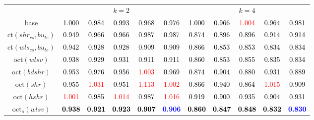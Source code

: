 \begin{tabular}[t]{c|>{}cccc>{}c|ccccc}
\addlinespace[0.3em]
\multicolumn{1}{c}{} & \multicolumn{5}{c}{\textbf{$k = 2$}} & \multicolumn{5}{c}{\textbf{$k = 4$}}\\
base & \textcolor{black}{1.000} & \textcolor{black}{0.984} & \textcolor{black}{0.993} & \textcolor{black}{0.968} & \textcolor{black}{0.976} & \textcolor{black}{1.000} & \textcolor{black}{0.966} & \textcolor{red}{1.004} & \textcolor{black}{0.964} & \textcolor{black}{0.981}\\
ct$(shr_{cs}, bu_{te})$ & \textcolor{black}{0.949} & \textcolor{black}{0.966} & \textcolor{black}{0.966} & \textcolor{black}{0.987} & \textcolor{black}{0.987} & \textcolor{black}{0.874} & \textcolor{black}{0.896} & \textcolor{black}{0.896} & \textcolor{black}{0.914} & \textcolor{black}{0.914}\\
ct$(wls_{cs}, bu_{te})$ & \textcolor{black}{0.942} & \textcolor{black}{0.928} & \textcolor{black}{0.928} & \textcolor{black}{0.909} & \textcolor{black}{0.909} & \textcolor{black}{0.866} & \textcolor{black}{0.853} & \textcolor{black}{0.853} & \textcolor{black}{0.834} & \textcolor{black}{0.834}\\
oct$(wlsv)$ & \textcolor{black}{0.938} & \textcolor{black}{0.929} & \textcolor{black}{0.931} & \textcolor{black}{0.911} & \textcolor{black}{0.911} & \textcolor{black}{0.860} & \textcolor{black}{0.853} & \textcolor{black}{0.855} & \textcolor{black}{0.835} & \textcolor{black}{0.834}\\
oct$(bdshr)$ & \textcolor{black}{0.953} & \textcolor{black}{0.976} & \textcolor{black}{0.956} & \textcolor{red}{1.003} & \textcolor{black}{0.969} & \textcolor{black}{0.874} & \textcolor{black}{0.904} & \textcolor{black}{0.880} & \textcolor{black}{0.931} & \textcolor{black}{0.889}\\
oct$(shr)$ & \textcolor{black}{0.955} & \textcolor{red}{1.031} & \textcolor{black}{0.951} & \textcolor{red}{1.113} & \textcolor{red}{1.002} & \textcolor{black}{0.866} & \textcolor{black}{0.940} & \textcolor{black}{0.864} & \textcolor{red}{1.015} & \textcolor{black}{0.909}\\
oct$(hshr)$ & \textcolor{red}{1.001} & \textcolor{black}{0.985} & \textcolor{red}{1.014} & \textcolor{black}{0.987} & \textcolor{red}{1.016} & \textcolor{black}{0.919} & \textcolor{black}{0.900} & \textcolor{black}{0.935} & \textcolor{black}{0.904} & \textcolor{black}{0.931}\\
oct$_o(wlsv)$ & \textcolor{black}{\textbf{0.938}} & \textcolor{black}{\textbf{0.921}} & \textcolor{black}{\textbf{0.923}} & \textcolor{black}{\textbf{0.907}} & \textcolor{blue}{\textbf{0.906}} & \textcolor{black}{\textbf{0.860}} & \textcolor{black}{\textbf{0.847}} & \textcolor{black}{\textbf{0.848}} & \textcolor{black}{\textbf{0.832}} & \textcolor{blue}{\textbf{0.830}}\\

\end{tabular}
